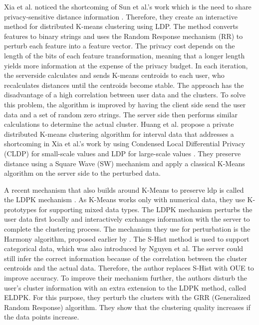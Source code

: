 Xia et al. noticed the shortcoming of Sun et al.'s work which is the need to share privacy-sensitive distance information \citep{xia_distributed_2020}.
Therefore, they create an interactive method for distributed K-means clustering using LDP.
The method converts features to binary strings and uses the Random Response mechanism (RR) to perturb each feature into a feature vector.
The privacy cost depends on the length of the bits of each feature transformation, meaning that a longer length yields more information at the expense of the privacy budget.
In each iteration, the serverside calculates and sends K-means centroids to each user, who recalculates distances until the centroids become stable.
The approach has the disadvantage of a high correlation between user data and the clusters.
To solve this problem, the algorithm is improved by having the client side send the user data and a set of random zero strings.
The server side then performs similar calculations to determine the actual cluster.
Huang et al. propose a private distributed K-means clustering algorithm for interval data that addresses a shortcoming in Xia et al.'s work by using Condensed Local Differential Privacy (CLDP) for small-scale values and LDP for large-scale values \citep{9679364}.
They preserve distance using a Square Wave (SW) mechanism and apply a classical K-Means algorithm on the server side to the perturbed data.

A recent mechanism that also builds around K-Means to preserve \gls{ldp} is called the LDPK mechanism \citep{yuan_privacypreserving_2021}.
As K-Means works only with numerical data, they use K-prototypes for supporting mixed data types.
The LDPK mechanism perturbs the user data first locally and interactively exchanges information with the server to complete the clustering process.
The mechanism they use for perturbation is the Harmony algorithm, proposed earlier by \citep{nguyen_collecting_2016}.
The S-Hist method is used to support categorical data, which was also introduced by Nguyen et al.
The server could still infer the correct information because of the correlation between the cluster centroids and the actual data.
Therefore, the author replaces S-Hist with OUE \citep{wang_locally_nodate} to improve accuracy.
To improve their mechanism further, the authors disturb the user’s cluster information with an extra extension to the LDPK method, called ELDPK.
For this purpose, they perturb the clusters with the GRR (Generalized Random Response) algorithm.
They show that the clustering quality increases if the data points increase. \newline

